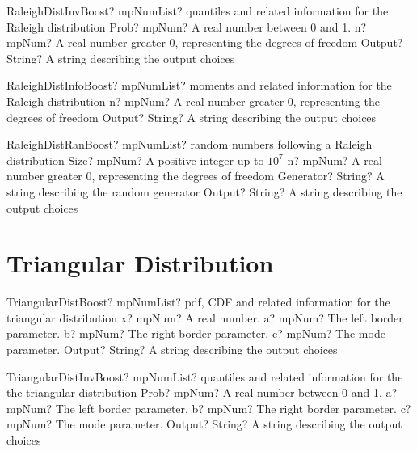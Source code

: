 \documentclass[12pt,a4paper,openany]{book}
\begin{document}
\begin{mpFunctionsExtract}
\mpFunctionThreeNotImplemented
{RaleighDistInvBoost? mpNumList? quantiles and related information for the Raleigh distribution}
{Prob? mpNum? A real number between 0 and 1.}
{n? mpNum? A real number greater 0, representing the degrees of freedom}
{Output? String? A string describing the output choices}
\end{mpFunctionsExtract}

\begin{mpFunctionsExtract}
\mpFunctionTwoNotImplemented
{RaleighDistInfoBoost? mpNumList? moments and related information for the Raleigh distribution}
{n? mpNum? A real number greater 0, representing the degrees of freedom}
{Output? String? A string describing the output choices}
\end{mpFunctionsExtract}

\begin{mpFunctionsExtract}
\mpFunctionFourNotImplemented
{RaleighDistRanBoost? mpNumList? random numbers following a Raleigh distribution}
{Size? mpNum? A positive integer up to $10^7$}
{n? mpNum? A real number greater 0, representing the degrees of freedom}
{Generator? String? A string describing the random generator}
{Output? String? A string describing the output choices}
\end{mpFunctionsExtract}

\section{Triangular Distribution}

\begin{mpFunctionsExtract}
\mpFunctionFiveNotImplemented
{TriangularDistBoost? mpNumList? pdf, CDF and related information for the triangular distribution}
{x? mpNum? A real number.}
{a? mpNum? The left border parameter.}
{b? mpNum? The right border parameter.}
{c? mpNum? The mode parameter.}
{Output? String? A string describing the output choices}
\end{mpFunctionsExtract}

\begin{mpFunctionsExtract}
\mpFunctionFiveNotImplemented
{TriangularDistInvBoost? mpNumList? quantiles and related information for the the triangular distribution}
{Prob? mpNum? A real number between 0 and 1.}
{a? mpNum? The left border parameter.}
{b? mpNum? The right border parameter.}
{c? mpNum? The mode parameter.}
{Output? String? A string describing the output choices}
\end{mpFunctionsExtract}
\end{document}
